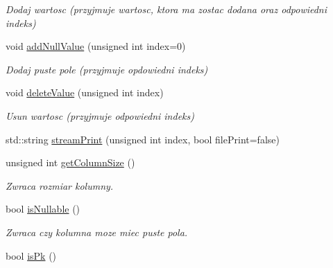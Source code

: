 \begin{DoxyCompactItemize}
\begin{DoxyCompactList}\small\item\em Dodaj wartosc (przyjmuje wartosc, ktora ma zostac dodana oraz odpowiedni indeks) \end{DoxyCompactList}\item 
\mbox{\label{class_column_ae31c40b1f30b13e1f05694792bf84fe3}} 
void \mbox{\hyperlink{class_column_ae31c40b1f30b13e1f05694792bf84fe3}{add\+Null\+Value}} (unsigned int index=0)
\begin{DoxyCompactList}\small\item\em Dodaj puste pole (przyjmuje opdowiedni indeks) \end{DoxyCompactList}\item 
\mbox{\label{class_column_ad451edfb49eca6136269ba885ba8f5f2}} 
void \mbox{\hyperlink{class_column_ad451edfb49eca6136269ba885ba8f5f2}{delete\+Value}} (unsigned int index)
\begin{DoxyCompactList}\small\item\em Usun wartosc (przyjmuje odpowiedni indeks) \end{DoxyCompactList}\item 
std\+::string \mbox{\hyperlink{class_column_a01f68d75e582070faf9b53e49a50c740}{stream\+Print}} (unsigned int index, bool file\+Print=false)
\item 
\mbox{\label{class_column_a28f0dc54b6248de35dbe980ff33e3e35}} 
unsigned int \mbox{\hyperlink{class_column_a28f0dc54b6248de35dbe980ff33e3e35}{get\+Column\+Size}} ()
\begin{DoxyCompactList}\small\item\em Zwraca rozmiar kolumny. \end{DoxyCompactList}\item 
\mbox{\label{class_column_ae82ecb46ea5e8a5849dd437d03c5dd18}} 
bool \mbox{\hyperlink{class_column_ae82ecb46ea5e8a5849dd437d03c5dd18}{is\+Nullable}} ()
\begin{DoxyCompactList}\small\item\em Zwraca czy kolumna moze miec puste pola. \end{DoxyCompactList}\item 
\mbox{\label{class_column_a02a49330774bf62536d686757e84873b}} 
bool \mbox{\hyperlink{class_column_a02a49330774bf62536d686757e84873b}{is\+Pk}} ()

\end{DoxyCompactItemize}
